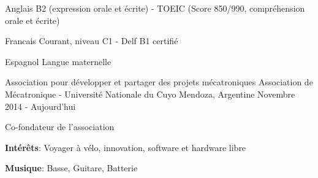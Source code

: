 

\begin{cvskills}
	
	\cvskill
	{Anglais} %
	{B2 (expression orale et écrite) - TOEIC (Score 850/990, compréhension orale et écrite)} %
	
	\cvskill
	{Francais} %
	{Courant, niveau C1 - Delf B1 certifié} %
	
	\cvskill
	{Espagnol} %
	{Langue maternelle } %
	
	
\end{cvskills}



\begin{cventries}
	
	\cventry
	{Association  pour développer et partager des projets mécatroniques} %
	{Association de Mécatronique - Université Nationale du Cuyo} %
	{Mendoza, Argentine} %
	{Novembre 2014 - Aujourd'hui} %
	{
		\begin{cvitems} %
			\item {Co-fondateur de l'association}
		\end{cvitems}
	}
	\cventry
	{} %
	{} %
	{} %
	{} %
	{
		\begin{cvitems} %
			\item {\textbf{Intérêts}: Voyager à vélo, innovation, software et hardware libre}
			\item {\textbf{Musique}: Basse, Guitare, Batterie}
		\end{cvitems}
	}		
\end{cventries}

